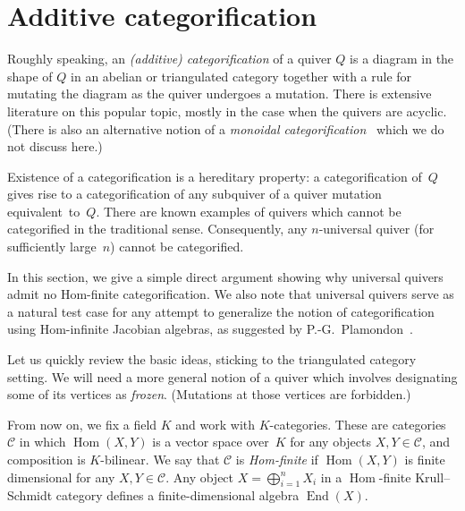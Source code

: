 \documentclass[ALCO,ThmDefs,Unicode,epreuves,published]{cedram}
\DeclareMathOperator{\Hom}{Hom}
\DeclareMathOperator{\End}{End}
\begin{document}

\section{Additive categorification}
\label{sec:categorification}

Roughly speaking, an \emph{(additive) categorification} of a quiver 
$Q$ is a diagram in the shape of $Q$ in an abelian or triangulated category together with a rule for mutating the diagram as the quiver undergoes a mutation. 
There is extensive literature on this popular topic, mostly in the case when the quivers are acyclic. 
(There is also an alternative notion of a \emph{monoidal categorification}~\cite{leclerc-hernandez}
which we do not discuss here.) 

Existence of a categorification is a hereditary property: a categorification of~$Q$ gives rise to a categorification of any subquiver of a quiver mutation equivalent~to~$Q$. 
There are known examples of quivers which cannot be categorified in the traditional sense. 
Consequently, any $n$-universal quiver (for sufficiently large~$n$) cannot be categorified. 

In this section, we give a simple direct argument showing why universal quivers admit no Hom-finite categorification. We also note that universal quivers serve as a natural test case for any attempt to generalize the notion of categorification using Hom-infinite Jacobian algebras, as suggested by P.-G.~Plamondon~\cite{plamondon}.

Let us quickly review the basic ideas, sticking to the triangulated category setting. 
We will need a more general notion of a quiver which involves designating some of its vertices as \emph{frozen}. (Mutations at those vertices are forbidden.) 

From now on, we fix a field $K$ and work with $K$-categories. These are categories $\mathcal C$ in which $\Hom(X,Y)$ is a vector space over~$K$ for any objects $X,Y\in \mathcal C$, and composition is $K$-bilinear. We say that $\mathcal C$ is \emph{Hom-finite} if $\Hom(X,Y)$ is finite dimensional for any $X,Y\in \mathcal C$.
%
Any object $X=\bigoplus_{i=1}^nX_i$ in a $\Hom $-finite Krull--Schmidt category defines a finite-dimensional algebra $\End (X)$.
\end{document}
